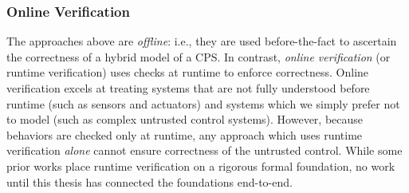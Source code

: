 \documentclass[12pt]{cmuthesis}
\theoremstyle{definition}
\theoremstyle{remark}
\begin{document}
\subsubsection{Online Verification}
The approaches above are \emph{offline}: i.e., they are used before-the-fact to ascertain the correctness of a hybrid model of a CPS.
In contrast, \emph{online verification} (or runtime verification) uses checks at runtime to enforce correctness.
Online verification excels at treating systems that are not fully understood before runtime (such as sensors and actuators) and systems which we simply prefer not to model (such as complex untrusted control systems).
However, because behaviors are checked only at runtime, any approach which uses runtime verification \emph{alone} cannot ensure correctness of the untrusted control.
While some prior works place runtime verification on a rigorous formal foundation, no work until this thesis has connected the foundations end-to-end.
\end{document}
